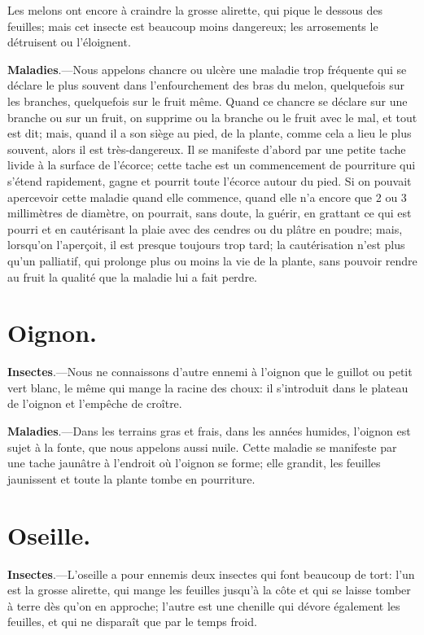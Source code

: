 \documentclass[10pt,a4paper]{book}
\begin{document}
Les melons ont encore à craindre la grosse alirette, qui pique le dessous des feuilles; mais cet insecte est beaucoup moins dangereux; les arrosements le détruisent ou l'éloignent.

\textbf{Maladies}.---Nous appelons chancre ou ulcère une maladie trop fréquente qui se déclare le plus souvent dans l'enfourchement des bras du melon, quelquefois sur les branches, quelquefois sur le fruit même. Quand ce chancre se déclare sur une branche ou sur un fruit, on supprime ou la branche ou le fruit avec le mal, et tout est dit; mais, quand il a son siège au pied, de la plante, comme cela a lieu le plus souvent, alors il est très-dangereux. Il se manifeste d'abord par une petite tache livide à la surface de l'écorce; cette tache est un commencement de pourriture qui s'étend rapidement, gagne et pourrit toute l'écorce autour du pied. Si on pouvait apercevoir cette maladie quand elle commence, quand elle n'a encore que 2 ou 3 millimètres de diamètre, on pourrait, sans doute, la guérir, en grattant ce qui est pourri et en cautérisant la plaie avec des cendres ou du plâtre en poudre; mais, lorsqu'on l'aperçoit, il est presque toujours trop tard; la cautérisation n'est plus qu'un palliatif, qui prolonge plus ou moins la vie de la plante, sans pouvoir rendre au fruit la qualité que la maladie lui a fait perdre.

\section{Oignon.}

\textbf{Insectes}.---Nous ne connaissons d'autre ennemi à l'oignon que le guillot ou petit vert blanc, le même qui mange la racine des choux: il s'introduit dans le plateau de l'oignon et l'empêche de croître.

\textbf{Maladies}.---Dans les terrains gras et frais, dans les années humides, l'oignon est sujet à la fonte, que nous appelons aussi nuile. Cette maladie se manifeste par une tache jaunâtre à l'endroit où l'oignon se forme; elle grandit, les feuilles jaunissent et toute la plante tombe en pourriture.

\section{Oseille.}

\textbf{Insectes}.---L'oseille a pour ennemis deux insectes qui font beaucoup de tort: l'un est la grosse alirette, qui mange les feuilles jusqu'à la côte et qui se laisse tomber à terre dès qu'on en approche; l'autre est une chenille qui dévore également les feuilles, et qui ne disparaît que par le temps froid.
\end{document}

